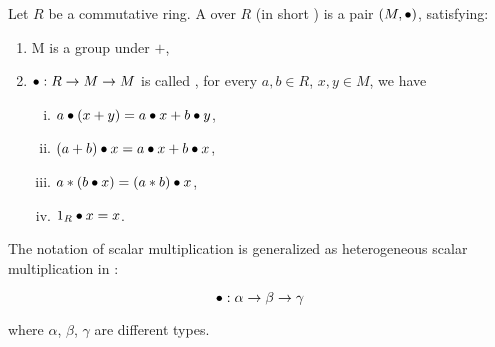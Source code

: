 
    
        



\begin{definition}[Module]
    \label{Module}
    \leanok

    Let $R$ be a commutative ring. A  over $R$ (in short ) is a pair $(M, \bullet)$, satisfying:

    \begin{enumerate}
      \item M is a group under $+$,
    
      \item $\bullet : R \to M \to M$ is called , for every $a, b \in R$, $x, y \in M$, we have
      
        \begin{enumerate}[(i)]
            \item $a \bullet (x + y) = a \bullet x + b \bullet y$,
            \item $(a + b) \bullet x = a \bullet x + b \bullet x$,
            \item $a * (b \bullet x)=(a * b) \bullet x$,
            \item $1_R \bullet x = x$.
        \end{enumerate}
    \end{enumerate}

\end{definition}

\begin{remark}
    \label{mk:Module}

    The notation of scalar multiplication is generalized as heterogeneous scalar multiplication  in \Mathlib:

    $$
    \bullet : \alpha \to \beta \to \gamma
    $$

    where $\alpha$, $\beta$, $\gamma$ are different types.
    
\end{remark}

